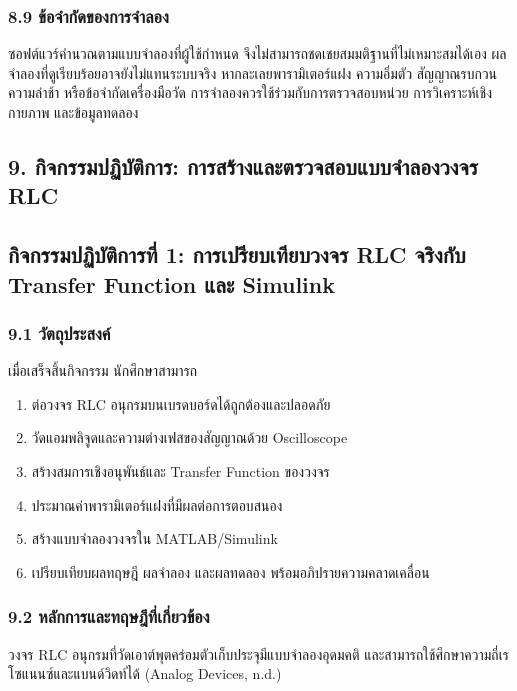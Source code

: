 \subsubsection{8.9 ข้อจำกัดของการจำลอง}

ซอฟต์แวร์คำนวณตามแบบจำลองที่ผู้ใช้กำหนด จึงไม่สามารถชดเชยสมมติฐานที่ไม่เหมาะสมได้เอง ผลจำลองที่ดูเรียบร้อยอาจยังไม่แทนระบบจริง หากละเลยพารามิเตอร์แฝง ความอิ่มตัว สัญญาณรบกวน ความล่าช้า หรือข้อจำกัดเครื่องมือวัด การจำลองควรใช้ร่วมกับการตรวจสอบหน่วย การวิเคราะห์เชิงกายภาพ และข้อมูลทดลอง

\subsection{9. กิจกรรมปฏิบัติการ: การสร้างและตรวจสอบแบบจำลองวงจร RLC}

\subsection{กิจกรรมปฏิบัติการที่ 1: การเปรียบเทียบวงจร RLC จริงกับ Transfer Function และ Simulink}

\subsubsection{9.1 วัตถุประสงค์}

เมื่อเสร็จสิ้นกิจกรรม นักศึกษาสามารถ

\begin{enumerate}
    \item ต่อวงจร RLC อนุกรมบนเบรดบอร์ดได้ถูกต้องและปลอดภัย
    \item วัดแอมพลิจูดและความต่างเฟสของสัญญาณด้วย Oscilloscope
    \item สร้างสมการเชิงอนุพันธ์และ Transfer Function ของวงจร
    \item ประมาณค่าพารามิเตอร์แฝงที่มีผลต่อการตอบสนอง
    \item สร้างแบบจำลองวงจรใน MATLAB/Simulink
    \item เปรียบเทียบผลทฤษฎี ผลจำลอง และผลทดลอง พร้อมอภิปรายความคลาดเคลื่อน
\end{enumerate}

\subsubsection{9.2 หลักการและทฤษฎีที่เกี่ยวข้อง}

วงจร RLC อนุกรมที่วัดเอาต์พุตคร่อมตัวเก็บประจุมีแบบจำลองอุดมคติ และสามารถใช้ศึกษาความถี่เรโซแนนซ์และแบนด์วิดท์ได้ (Analog Devices, n.d.)

